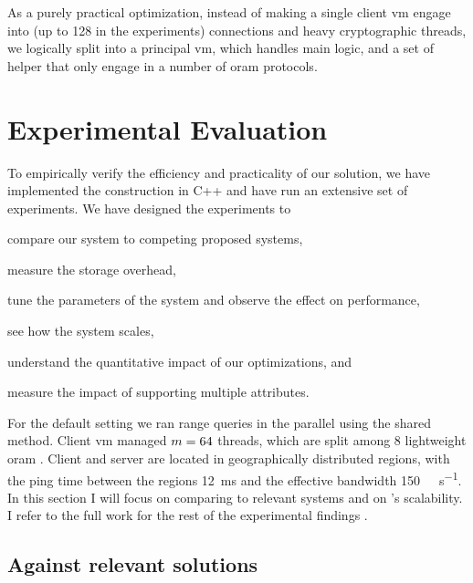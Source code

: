 			As a purely practical optimization, instead of making a single client \acrshort{vm} engage into \oramsNumber{} (up to 128 in the experiments) connections and heavy cryptographic threads, we logically split \user{} into a principal \acrshort{vm}, which handles main logic, and a set of helper  that only engage in a number of \acrshort{oram} protocols.

			

	\section{Experimental Evaluation}

		To empirically verify the efficiency and practicality of our solution, we have implemented the construction in C++ \cite{github-epsolute} and have run an extensive set of experiments.
		We have designed the experiments to
		\begin{enumerate*}[label=(\alph*)] %
			\item compare our system to competing proposed systems,
			\item measure the storage overhead,
			\item tune the parameters of the system and observe the effect on performance,
			\item see how the system scales,
			\item understand the quantitative impact of our optimizations, and
			\item measure the impact of supporting multiple attributes.
		\end{enumerate*}

		For the default setting we ran range queries in the parallel \epsolute{} using the shared \serverDS{} method.
		Client \acrshort{vm} managed $m = 64$ threads, which are split among 8 lightweight \acrshort{oram} .
		Client \user{} and server \server{} are located in geographically distributed regions, with the ping time between the regions \SI{12}{\milli\second} and the effective bandwidth \SI{150}{\mega\byte\per\second}.
		In this section I will focus on comparing \epsolute{} to relevant systems and on \epsolute{}'s scalability.
		I refer to the full work for the rest of the experimental findings \cite[Section 6]{epsolute}.

		\subsection{Against relevant solutions}

